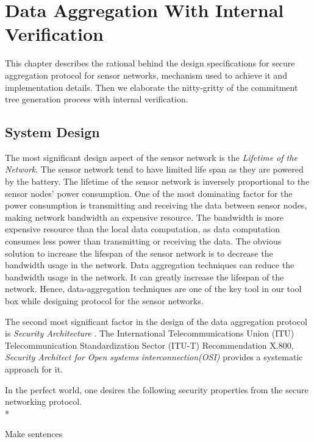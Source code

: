 \chapter{Data Aggregation With Internal Verification} %
\label{cha:Data Aggregation With Internal Verification}
	
	This chapter describes the rational behind the design specifications for secure aggregation protocol for sensor networks, mechanism used to achieve it and implementation details.
	Then we elaborate the nitty-gritty of the commitment tree generation process with internal verification.

	\section{System Design}

	The most significant design aspect of the sensor network is the \textit{Lifetime of the Network}.
	The sensor network tend to have limited life span as they are powered by the battery.
	The lifetime of the sensor network is inversely proportional to the sensor nodes' power consumption.
	One of the most dominating factor for the power consumption is transmitting and receiving the data between sensor nodes, making network bandwidth an expensive resource.
	The bandwidth is more expensive resource than the local data computation, as data computation consumes less power than transmitting or receiving the data.
	The obvious solution to increase the lifespan of the sensor network is to decrease the bandwidth usage in the network.  	
	Data aggregation techniques can reduce the bandwidth usage in the network. 
	It can greatly increase the lifespan of the network.
	Hence, data-aggregation techniques are one of the key tool in our tool box while designing protocol for the sensor networks.

	The second most significant factor in the design of the data aggregation protocol is \textit{Security Architecture }.
	The International Telecommunications Union (ITU) Telecommunication Standardization Sector (ITU-T) Recommendation X.800, \textit{Security Architect for Open systems interconnection(OSI)} provides a systematic approach for it.

	In the perfect world, one desires the following security properties from the secure networking protocol.\\*
	
	Make sentences

